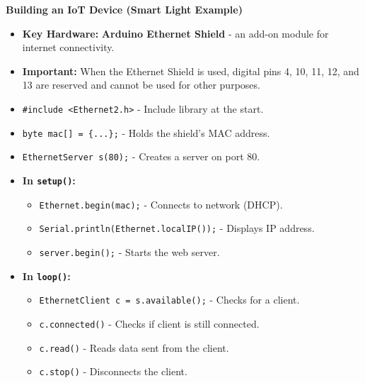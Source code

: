 \documentclass[a4paper, 8pt]{extarticle}
\newcommand{\subsectionheading}[1]{\normalsize\textbf{#1}}
\begin{document}
\begin{multicols}{2}
\subsectionheading{Building an IoT Device (Smart Light Example)}
\begin{itemize}
    \item \textbf{Key Hardware:} \textbf{Arduino Ethernet Shield} - an add-on module for internet connectivity.
    \item \textbf{Important:} When the Ethernet Shield is used, digital pins 4, 10, 11, 12, and 13 are reserved and cannot be used for other purposes.
\end{itemize}

\begin{tcolorbox}[title=\textbf{Core IoT/Ethernet Functions}]
    \begin{itemize}
        \item \texttt{\#include <Ethernet2.h>} - Include library at the start.
        \item \texttt{byte mac[] = \{...\};} - Holds the shield's MAC address.
        \item \texttt{EthernetServer s(80);} - Creates a server on port 80.
        \item \textbf{In \texttt{setup()}:}
        \begin{itemize}
            \item \texttt{Ethernet.begin(mac);} - Connects to network (DHCP).
            \item \texttt{Serial.println(Ethernet.localIP());} - Displays IP address.
            \item \texttt{server.begin();} - Starts the web server.
        \end{itemize}
        \item \textbf{In \texttt{loop()}:}
        \begin{itemize}
            \item \texttt{EthernetClient c = s.available();} - Checks for a client.
            \item \texttt{c.connected()} - Checks if client is still connected.
            \item \texttt{c.read()} - Reads data sent from the client.
            \item \texttt{c.stop()} - Disconnects the client.
        \end{itemize}
    \end{itemize}
\end{tcolorbox}


\end{multicols}
\end{document}
